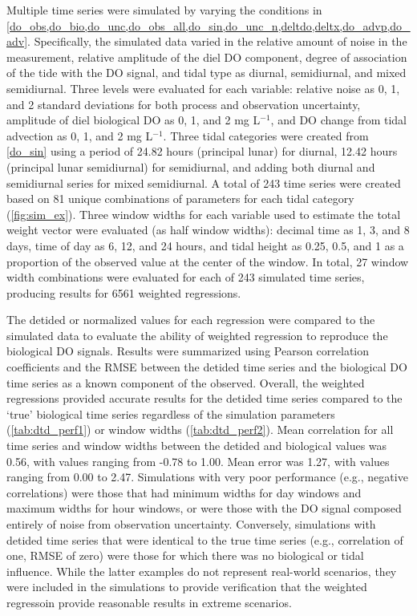 \documentclass[letterpaper,12pt,oneside]{article}\usepackage[]{graphicx}\usepackage[]{color}
\begin{document}
Multiple time series were simulated by varying the conditions in \cref{do_obs,do_bio,do_unc,do_obs_all,do_sin,do_unc_n,deltdo,deltx,do_advp,do_adv}. Specifically, the simulated data varied in the relative amount of noise in the measurement, relative amplitude of the diel \ac{DO} component, degree of association of the tide with the \ac{DO} signal, and tidal type as diurnal, semidiurnal, and mixed semidiurnal.  Three levels were evaluated for each variable: relative noise as 0, 1, and 2 standard deviations for both process and observation uncertainty, amplitude of diel biological \ac{DO} as 0, 1, and 2 mg L$^{-1}$, and \ac{DO} change from tidal advection as 0, 1, and 2 mg L$^{-1}$.  Three tidal categories were created from \cref{do_sin} using a period of 24.82 hours (principal lunar) for diurnal, 12.42 hours (principal lunar semidiurnal) for semidiurnal, and adding both diurnal and semidiurnal series for mixed semidiurnal. A total of 243 time series were created based on 81 unique combinations of parameters for each tidal category (\cref{fig:sim_ex}).  Three window widths for each variable used to estimate the total weight vector were evaluated (as half window widths): decimal time as 1, 3, and 8 days, time of day as 6, 12, and 24 hours, and tidal height as 0.25, 0.5, and 1 as a proportion of the observed value at the center of the window.  In total, 27 window width combinations were evaluated for each of 243 simulated time series, producing results for 6561 weighted regressions.

The detided or normalized values for each regression were compared to the simulated data to evaluate the ability of weighted regression to reproduce the biological \ac{DO} signals. Results were summarized using Pearson correlation coefficients and the \ac{RMSE} between the detided time series and the biological \ac{DO} time series as a known component of the observed.  Overall, the weighted regressions provided accurate results for the detided time series compared to the `true' biological time series regardless of the simulation parameters (\cref{tab:dtd_perf1}) or window widths (\cref{tab:dtd_perf2}).  Mean correlation for all time series and window widths between the detided and biological values was 0.56, with values ranging from -0.78 to 1.00.  Mean error was 1.27, with values ranging from 0.00 to 2.47.  Simulations with very poor performance (e.g., negative correlations) were those that had minimum widths for day windows and maximum widths for hour windows, or were those with the \ac{DO} signal composed entirely of noise from observation uncertainty. Conversely, simulations with detided time series that were identical to the true time series (e.g., correlation of one, \ac{RMSE} of zero) were those for which there was no biological or tidal influence.  While the latter examples do not represent real-world scenarios, they were included in the simulations to provide verification that the weighted regressoin provide reasonable results in extreme scenarios.  
\end{document}
